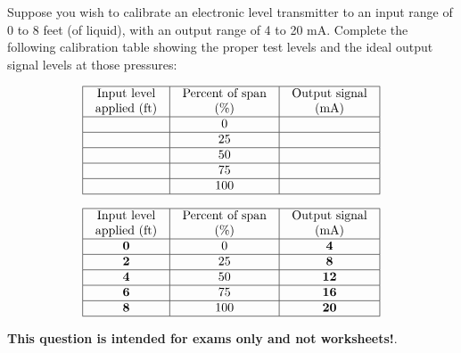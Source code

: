 

Suppose you wish to calibrate an electronic level transmitter to an input range of 0 to 8 feet (of liquid), with an output range of 4 to 20 mA.  Complete the following calibration table showing the proper test levels and the ideal output signal levels at those pressures:


$$\vbox{\offinterlineskip
\halign{\strut
\vrule \quad\hfil # \ \hfil & 
\vrule \quad\hfil # \ \hfil & 
\vrule \quad\hfil # \ \hfil \vrule \cr
\noalign{\hrule}
%
Input level & Percent of span & Output signal \cr
%
applied (ft) & (\%) & (mA) \cr
%
\noalign{\hrule}
%
 & 0 &  \cr
%
\noalign{\hrule}
%
 & 25 &  \cr
%
\noalign{\hrule}
%
 & 50 &  \cr
%
\noalign{\hrule}
%
 & 75 &  \cr
%
\noalign{\hrule}
%
 & 100 &  \cr
%
\noalign{\hrule}
} %
}$$ %








$$\vbox{\offinterlineskip
\halign{\strut
\vrule \quad\hfil # \ \hfil & 
\vrule \quad\hfil # \ \hfil & 
\vrule \quad\hfil # \ \hfil \vrule \cr
\noalign{\hrule}
%
Input level & Percent of span & Output signal \cr
%
applied (ft) & (\%) & (mA) \cr
%
\noalign{\hrule}
%
{\bf 0} & 0 & {\bf 4} \cr
%
\noalign{\hrule}
%
{\bf 2} & 25 & {\bf 8} \cr
%
\noalign{\hrule}
%
{\bf 4} & 50 & {\bf 12} \cr
%
\noalign{\hrule}
%
{\bf 6} & 75 & {\bf 16} \cr
%
\noalign{\hrule}
%
{\bf 8} & 100 & {\bf 20} \cr
%
\noalign{\hrule}
} %
}$$ %







{\bf This question is intended for exams only and not worksheets!}.



